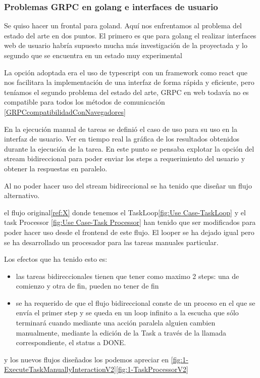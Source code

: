 
\subsubsection{Problemas GRPC en golang e interfaces de usuario}\label{subsec:problemas-rpc-en-golang}
Se quiso hacer un frontal para goland. Aquí nos enfrentamos al problema del estado del arte en dos puntos.
El primero es que para golang el realizar interfaces web de usuario habría supuesto mucha más investigación de la proyectada y lo segundo que se encuentra en un estado muy experimental

La opción adoptada era el uso de typescript con un framework como react que nos facilitara la implementación de una interfaz de forma rápida y eficiente, pero teníamos el segundo problema del estado del arte, GRPC en web todavía no es compatible para todos los métodos de comunicación \ref{GRPCcompatibilidadConNavegadores}

En la ejecución manual de tareas se definió el caso de uso para su uso en la interfaz de usuario. Ver en tiempo real la gráfica de los resultados obtenidos durante la ejecución de la tarea. En este punto se pensaba explotar la opción del stream bidireccional para poder enviar los steps a requerimiento del usuario y obtener la respuestas en paralelo.

Al no poder hacer uso del stream bidireccional se ha tenido que diseñar un flujo alternativo.

el flujo original\ref{ref:X} donde tenemos el TaskLoop\ref{fig:Use Case-TaskLoop} y el task Processor \ref{fig:Use Case-Task Processor} han tenido que ser modificados para poder hacer uso desde el frontend de este flujo. El looper se ha dejado igual pero se ha desarrollado un procesador para las tareas manuales particular.

Los efectos que ha tenido esto es:
\begin{itemize}
    \item las tareas bidireccionales tienen que tener como maximo 2 steps: una de comienzo y otra de fin, pueden no tener de fin
    \item se ha requerido de que el flujo bidireccional conste de un proceso en el que se envía el primer step y se queda en un loop infinito a la escucha que sólo terminará cuando mediante una acción paralela alguien cambien manualmente, mediante la edición de la Task a través de la llamada correspondiente, el status a DONE.
\end{itemize}

y los nuevos flujos diseñados los podemos apreciar en \ref{fig:1-ExecuteTaskManuallyInteractionV2}\ref{fig:1-TaskProcessorV2}

